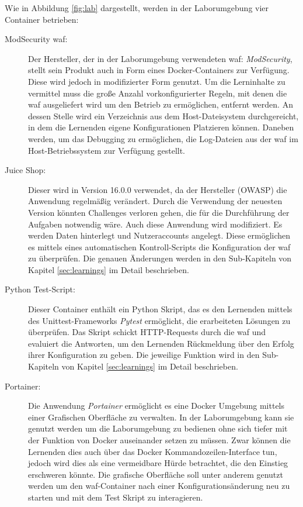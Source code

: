 Wie in Abbildung \ref{fig:lab} dargestellt, werden in der Laborumgebung vier Container betrieben:

\begin{description}
    \item[ModSecurity \ac{waf}:] Der Hersteller, der in der Laborumgebung verwendeten \ac{waf}: \textit{ModSecurity}, stellt sein Produkt auch in Form eines Docker-Containers zur Verfügung. 
    Diese wird jedoch in modifizierter Form genutzt.
    Um die Lerninhalte zu vermittel muss die große Anzahl vorkonfigurierter Regeln, mit denen die \ac{waf} ausgeliefert wird um den Betrieb zu ermöglichen, entfernt werden.
    An dessen Stelle wird ein Verzeichnis aus dem Host-Dateisystem durchgereicht, in dem die Lernenden eigene Konfigurationen Platzieren können.
    Daneben werden, um das Debugging zu ermöglichen, die Log-Dateien aus der \ac{waf} im Host-Betriebssystem zur Verfügung gestellt.
    
    \item[Juice Shop:] Dieser wird in Version 16.0.0 verwendet, da der Hersteller (OWASP) die Anwendung regelmäßig verändert.
    Durch die Verwendung der neuesten Version könnten Challenges verloren gehen, die für die Durchführung der Aufgaben notwendig wäre.
    Auch diese Anwendung wird modifiziert.
    Es werden Daten hinterlegt und Nutzeraccounts angelegt.
    Diese ermöglichen es mittels eines automatischen Kontroll-Scripts die Konfiguration der \ac{waf} zu überprüfen.
    Die genauen Änderungen werden in den Sub-Kapiteln von Kapitel \ref{sec:learnings} im Detail beschrieben.

    \item[Python Test-Script:] Dieser Container enthält ein Python Skript, das es den Lernenden mittels des Unittest-Frameworks \textit{Pytest} ermöglicht, die erarbeiteten Lösungen zu überprüfen.
    Das Skript schickt HTTP-Requests durch die \ac{waf} und evaluiert die Antworten, um den Lernenden Rückmeldung über den Erfolg ihrer Konfiguration zu geben.
    Die jeweilige Funktion wird in den Sub-Kapiteln von Kapitel \ref{sec:learnings} im Detail beschrieben.

    \item[Portainer:] Die Anwendung \textit{Portainer} ermöglicht es eine Docker Umgebung mittels einer Grafischen Oberfläche zu verwalten.
    In der Laborumgebung kann sie genutzt werden um die Laborumgebung zu bedienen ohne sich tiefer mit der Funktion von Docker auseinander setzen zu müssen.
    Zwar können die Lernenden dies auch über das Docker Kommandozeilen-Interface tun, jedoch wird dies als eine vermeidbare Hürde betrachtet, die den Einstieg erschweren könnte.
    Die grafische Oberfläche soll unter anderem genutzt werden um den \ac{waf}-Container nach einer Konfigurationsänderung neu zu starten und mit dem Test Skript zu interagieren. 
\end{description}

